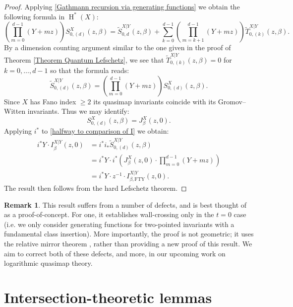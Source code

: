 \documentclass[10pt]{amsart}
\newcommand{\HH}{\operatorname{H}}
\theoremstyle{definition}
\theoremstyle{definition}
\newtheorem{remark}[thm]{Remark}
\begin{document}
\begin{proof}
Applying \eqref{Gathmann recursion via generating functions} we obtain the following formula in $\HH^*(X)$:
\begin{equation*} \left( \prod_{m=0}^{d-1} (Y+mz) \right) S^{X}_{0,(d)}(z,\beta) = \widetilde{S}_{0,d}^{X|Y}(z,\beta) + \sum_{k=0}^{d-1} \left(\prod_{m=k+1}^{d-1}(Y+mz) \right) \widetilde{T}^{X|Y}_{0,(k)}(z,\beta).\end{equation*}
By a dimension counting argument similar to the one given in the proof of Theorem \ref{Theorem Quantum Lefschetz}, we see that $\widetilde{T}^{X|Y}_{0,(k)}(z,\beta)=0$ for $k=0,\ldots,d-1$ so that the formula reads:
\begin{equation}\label{halfway to comparison of I} \widetilde{S}^{X|Y}_{0,(d)}(z,\beta) = \left( \prod_{m=0}^{d-1}(Y+mz) \right) S_{0,(d)}^X(z,\beta).\end{equation}
Since $X$ has Fano index $\geq 2$ its quasimap invariants coincide with its Gromov--Witten invariants. Thus we may identify:
\begin{equation*} S^X_{0,(d)}(z,\beta) = J^X_\beta(z,0).\end{equation*}
Applying $i^*$ to \eqref{halfway to comparison of I} we obtain:
\begin{align*} i^*Y \cdot I_\beta^{X|Y}(z,0) & = i^* i_* \widetilde{S}^{X|Y}_{0,(d)}(z,\beta) \\
& = i^*Y \cdot i^* \left(J^X_\beta(z,0) \cdot \prod_{m=0}^{d-1}(Y+mz) \right) \\
& = i^*Y \cdot z^{-1} \cdot I_{\beta,\mathrm{FTY}}^{X|Y}(z,0).\end{align*}
The result then follows from the hard Lefschetz theorem.\end{proof}

\begin{remark} This result suffers from a number of defects, and is best thought of as a proof-of-concept. For one, it establishes wall-crossing only in the $t=0$ case (i.e. we only consider generating functions for two-pointed invariants with a fundamental class insertion). More importantly, the proof is not geometric; it uses the relative mirror theorem \cite[Theorem 4.3]{FanTsengYou}, rather than providing a new proof of this result. We aim to correct both of these defects, and more, in our upcoming work on logarithmic quasimap theory.
\end{remark}


\appendix

\section{Intersection-theoretic lemmas}\label{appendix:intersection}
\end{document}
